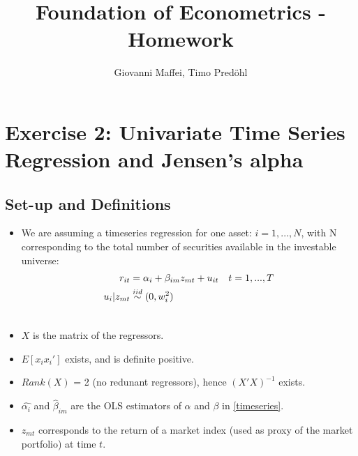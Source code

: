 \documentclass[12pt]{article}
\title{Foundation of Econometrics - Homework}
\author{Giovanni Maffei, Timo Predöhl}
\begin{document}
	
	\maketitle
	
	\begin{spacing}{1}
		\tableofcontents		
	\end{spacing}
	
	\pagebreak
	\section{Exercise 2: Univariate Time Series Regression and Jensen's alpha}
	\subsection{Set-up and Definitions}
	\begin{itemize}
		\item We are assuming a timeseries regression for one asset: $i=1,...,N$, with N corresponding to the total number of securities available in the investable universe:
			\begin{align} \label{timeseries}
				r_{it} &= \alpha_i + \beta_{im} z_{mt} + u_{it} \quad t = 1,...,T \\ 
				u_i|z_{mt} &\overset{iid}{\sim} (0, w_{i}^2) \notag \\ \notag
			\end{align} \vspace{-3em}
		\item $X$ is the matrix of the regressors.	
		\item $E[x_ix_i']$ exists, and is definite positive.	
		\item ${Rank}(X)$ = 2 (no redunant regressors), hence $(X'X)^{-1}$ exists.	
		\item $\hat{\alpha_i}$ and $\hat{\beta}_{im}$ are the OLS estimators of $\alpha$ and $\beta$ in \ref{timeseries}.
		\item $z_{mt}$ corresponds to the return of a market index (used as proxy of the market portfolio) at time $t$. 
	\end{itemize}
\end{document}
